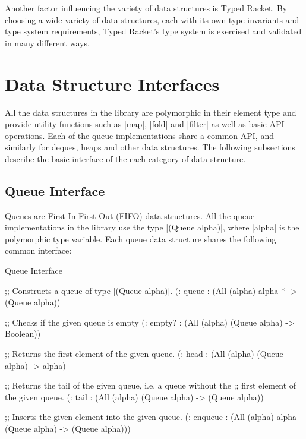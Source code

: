 Another factor influencing the variety of data structures is Typed
Racket. By choosing a wide variety of data structures, each with its own
type invariants and type system requirements, Typed Racket's type system
is exercised and validated in many different ways.

\section{Data Structure Interfaces}


All the data structures in the library are polymorphic in their element
type and provide utility functions such as \scheme|map|, \scheme|fold|
and \scheme|filter| as well as basic API operations. Each of the queue
implementations share a common API, and similarly for deques, heaps and
other data structures. The following subsections describe the basic
interface of the each category of data structure.

\subsection{Queue Interface}
Queues are First-In-First-Out (FIFO) data structures. All the queue
implementations in the library use the type \scheme|(Queue alpha)|,
where \scheme|alpha| is the polymorphic type variable. Each queue data
structure shares the following common interface:

\begin{file}{Queue Interface}
\begin{schemedisplay}
  ;; Constructs a queue of type \scheme|(Queue alpha)|.
  (: queue : (All (alpha) alpha * -> (Queue alpha))


  ;; Checks if the given queue is empty
  (: empty? : (All (alpha) (Queue alpha) -> Boolean))
  

  ;; Returns the first element of the given queue.
  (: head : (All (alpha) (Queue alpha) -> alpha)


  ;; Returns the tail of the given queue, i.e. a queue without the
  ;; first element of the given queue.
  (: tail : (All (alpha) (Queue alpha) -> (Queue alpha))


  ;; Inserts the given element into the given queue.
  (: enqueue : (All (alpha) alpha (Queue alpha) -> (Queue alpha)))

\end{schemedisplay}
\end{file}

